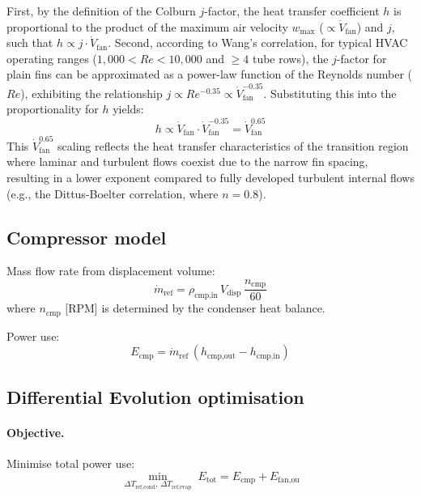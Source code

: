 First, by the definition of the Colburn $j$-factor, the heat transfer coefficient $h$ is proportional to the product of the maximum air velocity $w_\text{max}$ ($\propto \dot{V}_\text{fan}$) and $j$, such that $h \propto j \cdot \dot{V}_\text{fan}$. Second, according to Wang's correlation, for typical HVAC operating ranges ($1,000 < Re < 10,000$ and $\ge 4$ tube rows), the $j$-factor for plain fins can be approximated as a power-law function of the Reynolds number ($Re$), exhibiting the relationship $j \propto Re^{-0.35} \propto \dot{V}_\text{fan}^{-0.35}$. Substituting this into the proportionality for $h$ yields:
\begin{equation}\label{eq:ashp-h-scaling}
  h \propto \dot{V}_\text{fan} \cdot \dot{V}_\text{fan}^{-0.35} = \dot{V}_\text{fan}^{0.65}
\end{equation}
This $\dot{V}_\text{fan}^{0.65}$ scaling reflects the heat transfer characteristics of the transition region where laminar and turbulent flows coexist due to the narrow fin spacing, resulting in a lower exponent compared to fully developed turbulent internal flows (e.g., the Dittus-Boelter correlation, where $n=0.8$).

\subsection{Compressor model}

Mass flow rate from displacement volume:
\begin{equation}\label{eq:ashp-mdot}
  \dot{m}_\text{ref} = \rho_\text{cmp,in}\,V_\text{disp}\,\frac{n_\text{cmp}}{60}
\end{equation}
where $n_\text{cmp}$ [RPM] is determined by the condenser heat balance.

Power use:
\begin{equation}\label{eq:ashp-Ecmp}
  E_\text{cmp} = \dot{m}_\text{ref}\,(h_\text{cmp,out} - h_\text{cmp,in})
\end{equation}

\subsection{Differential Evolution optimisation}

\paragraph{Objective.}
Minimise total power use:
\begin{equation}\label{eq:ashp-obj}
  \min_{\Delta T_\text{ref,cond},\,\Delta T_\text{ref,evap}} \;
  E_\text{tot} = E_\text{cmp} + E_\text{fan,ou}
\end{equation}

